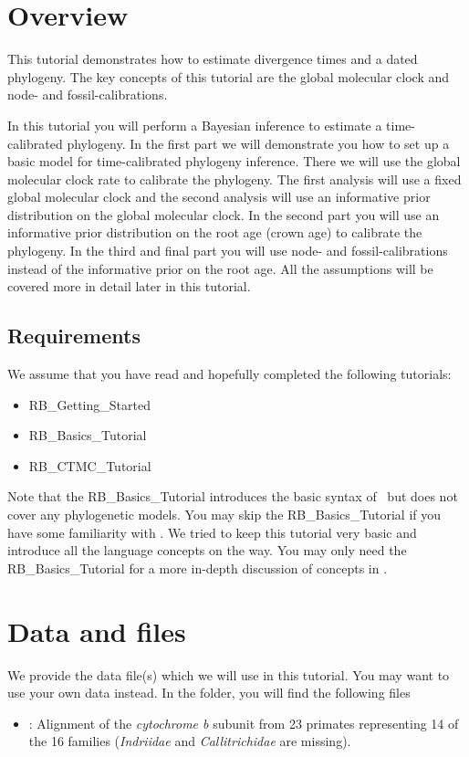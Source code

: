 \section{Overview}


This tutorial demonstrates how to estimate divergence times and a dated phylogeny. 
The key concepts of this tutorial are the global molecular clock and node- and fossil-calibrations.


In this tutorial you will perform a Bayesian inference to estimate a time-calibrated phylogeny.
In the first part we will demonstrate you how to set up a basic model for time-calibrated phylogeny inference.
There we will use the global molecular clock rate to calibrate the phylogeny.
The first analysis will use a fixed global molecular clock and the second analysis will use an informative prior distribution on the global molecular clock. 
In the second part you will use an informative prior distribution on the root age (crown age) to calibrate the phylogeny.
In the third and final part you will use node- and fossil-calibrations instead of the informative prior on the root age.
All the assumptions will be covered more in detail later in this tutorial.

\subsection*{Requirements}
We assume that you have read and hopefully completed the following tutorials:
\begin{itemize}
\item RB\_Getting\_Started
\item RB\_Basics\_Tutorial
\item RB\_CTMC\_Tutorial
\end{itemize}
Note that the RB\_Basics\_Tutorial introduces the basic syntax of \Rev~but does not cover any phylogenetic models.
You may skip the RB\_Basics\_Tutorial if you have some familiarity with \R.
We tried to keep this tutorial very basic and introduce all the language concepts on the way.
You may only need the RB\_Basics\_Tutorial for a more in-depth discussion of concepts in \Rev.


\section{Data and files}

We provide the data file(s) which we will use in this tutorial.
You may want to use your own data instead.
In the  folder, you will find the following files
\begin{itemize}
\item
{}: Alignment of the \textit{cytochrome b} subunit from 23 primates representing 14 of the 16 families (\textit{Indriidae} and \textit{Callitrichidae} are missing).
\end{itemize}

